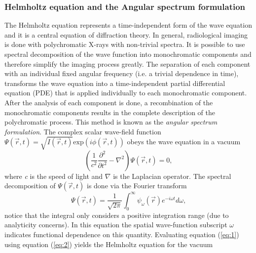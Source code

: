 \documentclass[9pt, a4paper]{article}
\begin{document}
\subsubsection{Helmholtz equation and the Angular spectrum formulation}
The Helmholtz equation represents a time-independent form of the wave equation and it is a central equation of diffraction theory\cite{CH49}\cite{Pags2006}\cite{Helmholtz}.
In general, radiological imaging is done with polychromatic X-rays with non-trivial spectra\cite{CH49}. It is possible to use spectral decomposition of the wave function into monochromatic components and therefore simplify the imaging process greatly. The separation of each component with an individual fixed angular frequency (i.e. a trivial dependence in time), transforms the wave equation into a time-independent partial differential equation (PDE) that is applied individually to each monochromatic component. After the analysis of each component is done, a recombination of the monochromatic components results in the complete description of the polychromatic process\cite{CH49}\cite{Pags2006}. This method is known as the \textit{angular spectrum formulation}. 
The complex scalar wave-field function $\Psi(\vec{r},t) = \sqrt{I(\vec{r},t)} \mathrm{exp}(i \phi(\vec{r},t))$ obeys the wave equation in a vacuum
\begin{equation}\label{eq:1}
\left ( \frac{1}{c^2} \frac{\partial^2 }{\partial t^2} -\nabla^2 \right ) \Psi(\vec{r},t) = 0,
\end{equation} 
where \textit{c} is the speed of light and $\nabla$ is the Laplacian operator.
The spectral decomposition of $\Psi(\vec{r},t)$ is done via the Fourier transform
\begin{equation}\label{eq:2}
\Psi(\vec{r},t) = \frac{1}{\sqrt{2 \pi}} \int_{0}^{\infty}\psi_{\omega}(\vec{r}) e^{-i\omega t}d\omega,
\end{equation}
notice that the integral only considers a positive integration range (due to analyticity concerns\cite{PagsTutes}). In this equation the spatial wave-function subscript $\omega$ indicates functional dependence on this quantity\cite{Pags2006}. Evaluating equation (\ref{eq:1}) using equation (\ref{eq:2}) yields the Helmholtz equation for the vacuum
\end{document}
